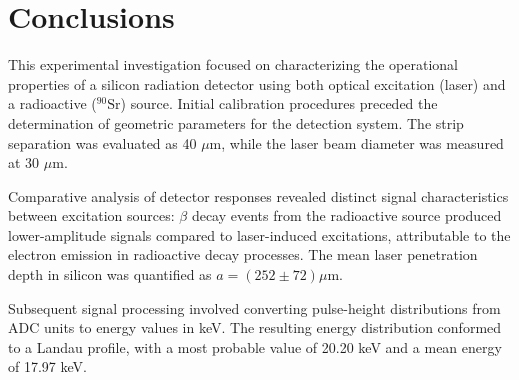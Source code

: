 \chapter*{Conclusions}\label{chap:conclusion}

This experimental investigation focused on characterizing the operational properties of a silicon radiation detector using both optical excitation (laser) and a radioactive ($^{90}\mathrm{Sr}$) source. Initial calibration procedures preceded the determination of geometric parameters for the detection system. The strip separation was evaluated as 40 $\mu$m, while the laser beam diameter was measured at 30 $\mu$m.

Comparative analysis of detector responses revealed distinct signal characteristics between excitation sources: $\beta$ decay events from the radioactive source produced lower-amplitude signals compared to laser-induced excitations, attributable to the electron emission in radioactive decay processes. The mean laser penetration depth in silicon was quantified as $a = (252 \pm 72)  \mu\text{m}$.

Subsequent signal processing involved converting pulse-height distributions from ADC units to energy values in keV. The resulting energy distribution conformed to a Landau profile, with a most probable value of 20.20 keV and a mean energy of 17.97 keV.
